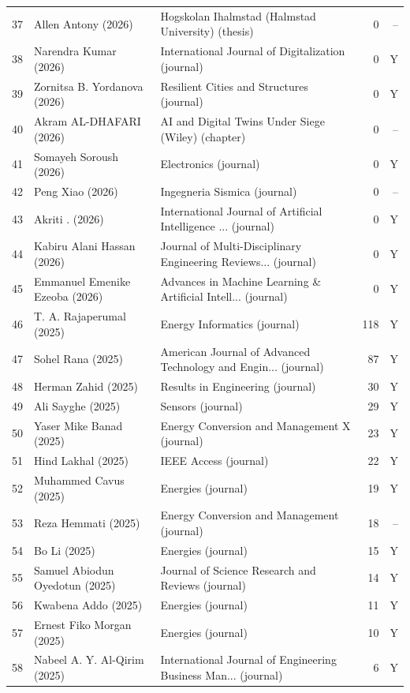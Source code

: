 \begin{longtable}{@{}r p{5.9cm} p{4.4cm} r r@{}}
37 & Allen Antony (2026) & Hogskolan Ihalmstad (Halmstad University) (thesis) & 0 & -- \\
38 & Narendra Kumar (2026) & International Journal of Digitalization (journal) & 0 & Y \\
39 & Zornitsa B. Yordanova (2026) & Resilient Cities and Structures (journal) & 0 & Y \\
40 & Akram AL-DHAFARI (2026) & AI and Digital Twins Under Siege (Wiley) (chapter) & 0 & -- \\
41 & Somayeh Soroush (2026) & Electronics (journal) & 0 & Y \\
42 & Peng Xiao (2026) & Ingegneria Sismica (journal) & 0 & -- \\
43 & Akriti . (2026) & International Journal of Artificial Intelligence ... (journal) & 0 & Y \\
44 & Kabiru Alani Hassan (2026) & Journal of Multi-Disciplinary Engineering Reviews... (journal) & 0 & Y \\
45 & Emmanuel Emenike Ezeoba (2026) & Advances in Machine Learning \& Artificial Intell... (journal) & 0 & Y \\
46 & T. A. Rajaperumal (2025) & Energy Informatics (journal) & 118 & Y \\
47 & Sohel Rana (2025) & American Journal of Advanced Technology and Engin... (journal) & 87 & Y \\
48 & Herman Zahid (2025) & Results in Engineering (journal) & 30 & Y \\
49 & Ali Sayghe (2025) & Sensors (journal) & 29 & Y \\
50 & Yaser Mike Banad (2025) & Energy Conversion and Management X (journal) & 23 & Y \\
51 & Hind Lakhal (2025) & IEEE Access (journal) & 22 & Y \\
52 & Muhammed Cavus (2025) & Energies (journal) & 19 & Y \\
53 & Reza Hemmati (2025) & Energy Conversion and Management (journal) & 18 & -- \\
54 & Bo Li (2025) & Energies (journal) & 15 & Y \\
55 & Samuel Abiodun Oyedotun (2025) & Journal of Science Research and Reviews (journal) & 14 & Y \\
56 & Kwabena Addo (2025) & Energies (journal) & 11 & Y \\
57 & Ernest Fiko Morgan (2025) & Energies (journal) & 10 & Y \\
58 & Nabeel A. Y. Al-Qirim (2025) & International Journal of Engineering Business Man... (journal) & 6 & Y \\

\end{longtable}
